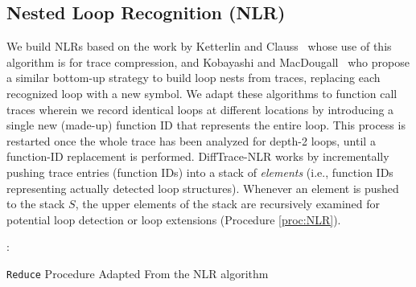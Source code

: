 
\subsection{Nested Loop Recognition (NLR)}
\label{subsec:algo-nlr}

We build NLRs based on the work by Ketterlin and Clauss~\cite{Ketterlin-nlr}
whose use of this algorithm is for trace compression,
and Kobayashi and MacDougall~\cite{kobayashi-84} who propose
a similar bottom-up strategy to build loop nests from traces,
replacing each recognized loop with a new symbol.
%
%
%
%
We adapt these algorithms
to function call traces
wherein we record
identical loops at different locations by introducing
a single new (made-up) function ID that represents the entire loop.
%
This process is restarted once the whole trace has been analyzed for depth-2 loops,
until a function-ID replacement is performed.
%
DiffTrace-NLR works by incrementally pushing trace entries (function IDs)
into a stack of \textit{elements} (i.e., function IDs
representing actually detected loop structures).
%
Whenever an element is pushed to the stack $S$,
the upper elements of the stack are recursively
examined for potential loop detection or loop extensions (Procedure \ref{proc:NLR}). 


\begin{small}
\begin{algorithm}[]
 \DontPrintSemicolon
 :{\\
 \Indp
 }

 \caption{\texttt{Reduce} Procedure Adapted From the NLR algorithm }
 \label{proc:NLR}
\end{algorithm}
\end{small}


